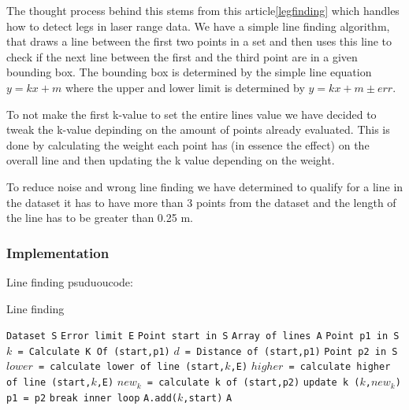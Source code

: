 \documentclass[a4paper, 10pt, conference]{ieeeconf}      %
\begin{document}
The thought process behind this stems from this article\ref{legfinding} which handles how to detect legs in laser range data. We have a simple line finding algorithm, that draws a line between the first two points in a set and then uses this line to check if the next line between the first and the third point are in a given bounding box. The bounding box is determined by the simple line equation $y = kx + m$ where the upper and lower limit is determined by $y = kx + m \pm err$. 

To not make the first k-value to set the entire lines value we have decided to tweak the k-value depinding on the amount of points already evaluated. This is done by calculating the weight each point has (in essence the effect) on the overall line and then updating the k value depending on the weight.

To reduce noise and wrong line finding we have determined to qualify for a line in the dataset it has to have more than 3 points from the dataset and the length of the line has to be greater than 0.25 m.
\subsubsection{Implementation}
Line finding psuduoucode:

\begin{algorithm}
  \caption{Line finding}\label{LineFinding}
  \begin{algorithmic}[1]
      \State \texttt{Dataset S}
      \State \texttt{Error limit E}
      \State \texttt{Point start in S}
      \State \texttt{Array of lines A}
      	\State \texttt{Point p1 in S}
      	\State \texttt{$k$ = Calculate K Of (start,p1)}
      	\State \texttt{$d$ = Distance of (start,p1)}
      		\State \texttt{Point p2 in S}
      		\State \texttt{$lower$ = calculate lower of line (start,$k$,E)}
      		\State \texttt{$higher$ = calculate higher of line (start,$k$,E)}
      			\State \texttt{$new_k$ = calculate k of (start,p2)}
      			\State \texttt{update k ($k$,$new_k$)}
      			\State \texttt{p1 = p2}
      		\Else
      			\State \texttt{break inner loop}
      		\EndIf
      	\EndWhile
      		\State \texttt{A.add($k$,start)}
      	\EndIf
      \EndWhile
      \Return \texttt{A}
  \end{algorithmic}
\end{algorithm}
\end{document}

